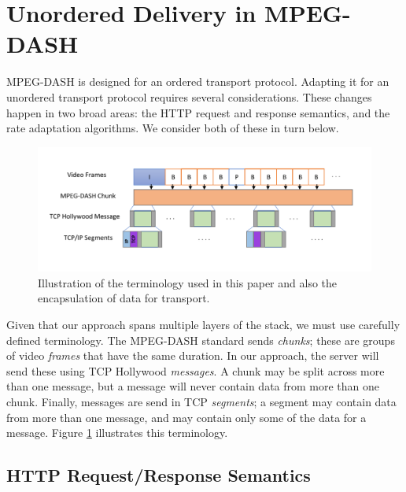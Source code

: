 \section{Unordered Delivery in MPEG-DASH}
\label{sec:transport}

MPEG-DASH is designed for an ordered transport protocol. Adapting it for an
unordered transport protocol requires several considerations. These
changes happen in two broad areas: the HTTP request and response semantics, and the rate
adaptation algorithms. We consider both of these in turn below.

\begin{figure}
  \centering
  \includegraphics[width=\columnwidth]{figures/terminology2.pdf}
  \caption{Illustration of the terminology used in this paper and also the encapsulation of data for transport.}
  \label{fig:terminology}
\end{figure}

Given that our approach spans multiple layers of the stack, we must use carefully defined
terminology. The MPEG-DASH standard sends \emph{chunks}; these are groups of video
\emph{frames} that have the same duration. In our approach, the server will send these
using TCP Hollywood \emph{messages}. A chunk may be split across more than one message,
but a message will never contain data from more than one chunk. Finally, messages are
send in TCP \emph{segments}; a segment may contain data from more than one message, and
may contain only some of the data for a message.
Figure \ref{fig:terminology} illustrates this terminology.

\subsection{HTTP Request/Response Semantics}

